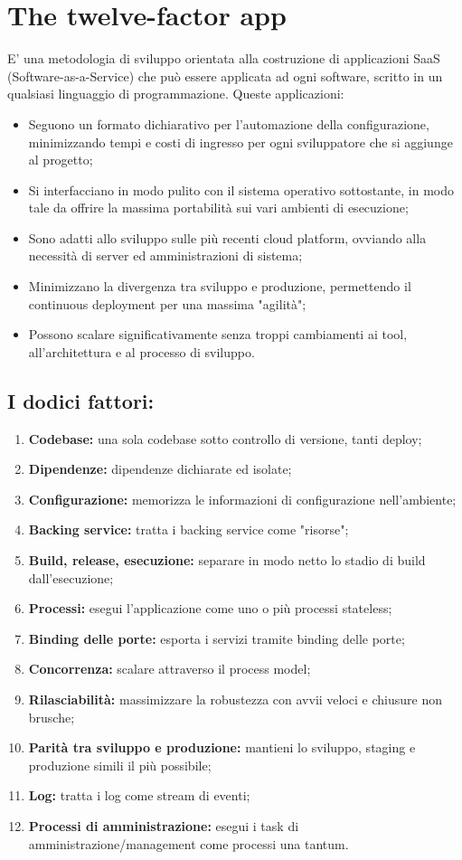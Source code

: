 \documentclass[PianoDiQualifica.tex]{subfiles}
\begin{document}
\chapter{The twelve-factor app}
E' una metodologia di sviluppo orientata alla costruzione di applicazioni SaaS (Software-as-a-Service) che può essere applicata ad ogni software, scritto in un qualsiasi linguaggio di programmazione.
Queste applicazioni:
\begin{itemize}
\item Seguono un formato dichiarativo per l'automazione della configurazione, minimizzando tempi e costi di ingresso per ogni sviluppatore che si aggiunge al progetto;
\item Si interfacciano in modo pulito con il sistema operativo sottostante, in modo tale da offrire la massima portabilità sui vari ambienti di esecuzione;
\item Sono adatti allo sviluppo sulle più recenti cloud platform, ovviando alla necessità di server ed amministrazioni di sistema;
\item Minimizzano la divergenza tra sviluppo e produzione, permettendo il continuous deployment per una massima "agilità";
\item Possono scalare significativamente senza troppi cambiamenti ai tool, all'architettura e al processo di sviluppo.
\end{itemize}

\section{I dodici fattori:}
\begin{enumerate}
\item \textbf{Codebase:} una sola codebase sotto controllo di versione, tanti deploy;
\item \textbf{Dipendenze:} dipendenze dichiarate ed isolate;
\item \textbf{Configurazione:} memorizza le informazioni di configurazione nell'ambiente;
\item \textbf{Backing service:} tratta i backing service come "risorse";
\item \textbf{Build, release, esecuzione:} separare in modo netto lo stadio di build dall'esecuzione;
\item \textbf{Processi:} esegui l'applicazione come uno o più processi stateless;
\item \textbf{Binding delle porte:} esporta i servizi tramite binding delle porte;
\item \textbf{Concorrenza:} scalare attraverso il process model;
\item \textbf{Rilasciabilità:} massimizzare la robustezza con avvii veloci e chiusure non brusche;
\item \textbf{Parità tra sviluppo e produzione:} mantieni lo sviluppo, staging e produzione simili il più possibile;
\item \textbf{Log:} tratta i log come stream di eventi;
\item \textbf{Processi di amministrazione:} esegui i task di amministrazione/management come processi una tantum.
\end{enumerate}
\end{document}
